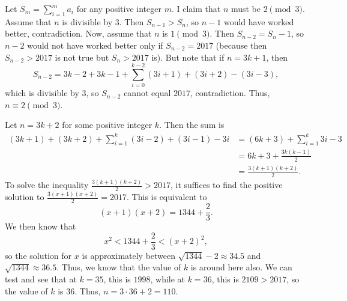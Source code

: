 Let $S_m=\displaystyle\sum_{i=1}^ma_i$ for any positive integer $m$. I claim that $n$ must be $2\pmod3$. Assume that $n$ is divisible by $3$. Then $S_{n-1}>S_n$, so $n-1$ would have worked better, contradiction. Now, assume that $n$ is $1\pmod 3$. Then $S_{n-2}=S_n-1$, so $n-2$ would not have worked better only if $S_{n-2}=2017$ (because then $S_{n-2}>2017$ is not true but $S_n>2017$ is). But note that if $n=3k+1$, then \[S_{n-2}=3k-2+3k-1+\displaystyle\sum_{i=0}^{k-2}\left(3i+1\right)+\left(3i+2\right)-\left(3i-3\right),\] which is divisible by $3$, so $S_{n-2}$ cannot equal $2017$, contradiction. Thus, $n\equiv2\pmod 3$.

Let $n=3k+2$ for some positive integer $k$. Then the sum is \begin{align*}\left(3k+1\right)+\left(3k+2\right)+\displaystyle\sum_{i=1}^k\left(3i-2\right)+\left(3i-1\right)-3i&=\left(6k+3\right)+\displaystyle\sum_{i=1}^k3i-3\\&=6k+3+\frac{3k\left(k-1\right)}{2}\\&=\frac{3\left(k+1\right)\left(k+2\right)}{2}.\end{align*} To solve the inequality $\frac{3\left(k+1\right)\left(k+2\right)}{2}>2017$, it suffices to find the positive solution to $\frac{3\left(x+1\right)\left(x+2\right)}{2}=2017$. This is equivalent to \[\left(x+1\right)\left(x+2\right)=1344+\frac{2}{3}.\] We then know that \[x^2<1344+\frac{2}{3}<\left(x+2\right)^2,\] so the solution for $x$ is approximately between $\sqrt{1344}-2\approx34.5$ and $\sqrt{1344}\approx36.5$. Thus, we know that the value of $k$ is around here also. We can test and see that at $k=35$, this is $1998$, while at $k=36$, this is $2109>2017$, so the value of $k$ is $36$. Thus, $n=3\cdot36+2=\boxed{110}$.